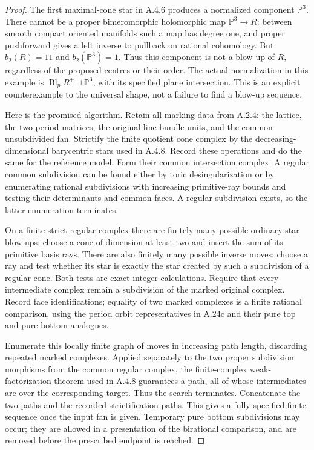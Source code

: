 \begin{proof}
The first maximal-cone star in A.4.6 produces a normalized
component $\mathbb P^3$. There cannot be a proper
bimeromorphic holomorphic map $\mathbb P^3\to R$:
between smooth compact oriented manifolds such a map
has degree one, and proper pushforward gives a left
inverse to pullback on rational cohomology. But
$b_2(R)=11$ and $b_2(\mathbb P^3)=1$.
Thus this component is not a blow-up of $R$, regardless
of the proposed centres or their order. The actual
normalization in this example is
$\operatorname{Bl}_pR^+\sqcup\mathbb P^3$,
with its specified plane intersection. This is an
explicit counterexample to the universal shape, not
a failure to find a blow-up sequence.

Here is the promised algorithm. Retain all marking
data from A.2.4: the lattice, the two period matrices,
the original line-bundle units, and the common
unsubdivided fan. Strictify the finite quotient cone
complex by the decreasing-dimensional barycentric
stars used in A.4.8. Record these operations and do
the same for the reference model. Form their common
intersection complex. A regular common subdivision
can be found either by toric desingularization or by
enumerating rational subdivisions with increasing
primitive-ray bounds and testing their determinants
and common faces. A regular subdivision exists, so
the latter enumeration terminates.

On a finite strict regular complex there are finitely
many possible ordinary star blow-ups: choose a cone
of dimension at least two and insert the sum of its
primitive basis rays. There are also finitely many
possible inverse moves: choose a ray and test whether
its star is exactly the star created by such a
subdivision of a regular cone. Both tests are exact
integer calculations. Require that every intermediate
complex remain a subdivision of the marked original
complex. Record face identifications; equality of two
marked complexes is a finite rational comparison,
using the period orbit representatives in A.24c and
their pure top and pure bottom analogues.

Enumerate this locally finite graph of moves in
increasing path length, discarding repeated marked
complexes. Applied separately to the two proper
subdivision morphisms from the common regular
complex, the finite-complex weak-factorization theorem
used in A.4.8 guarantees a path, all of whose
intermediates are over the corresponding target.
Thus the search terminates. Concatenate the two paths
and the recorded strictification paths. This gives a
fully specified finite sequence once the input fan is
given. Temporary pure bottom subdivisions may occur;
they are allowed in a presentation of the birational
comparison, and are removed before the prescribed
endpoint is reached.


\end{proof}

